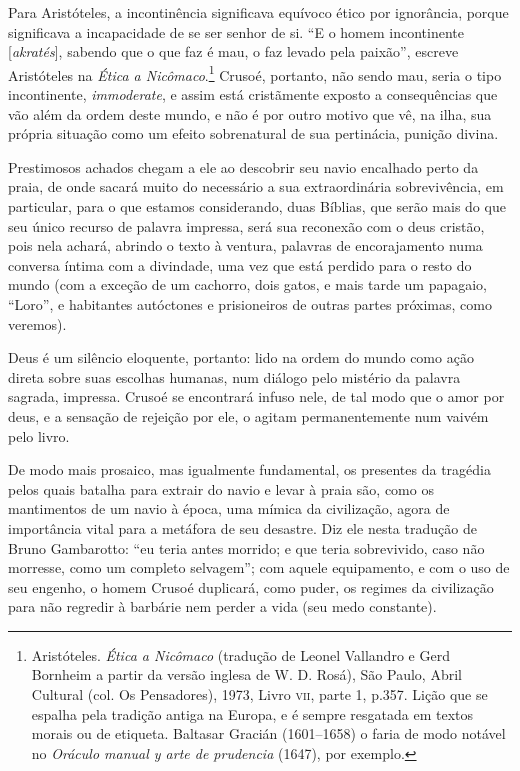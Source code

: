 Para Aristóteles, a incontinência significava equívoco ético por
ignorância, porque significava a incapacidade de se ser senhor de si.
``E o homem incontinente {[}\textit{akratés}{]}, sabendo que o que faz é mau, o
faz levado pela paixão'', escreve Aristóteles na \emph{Ética a
Nicômaco}.\footnote{Aristóteles. \emph{Ética a Nicômaco} (tradução de
  Leonel Vallandro e Gerd Bornheim a partir da versão inglesa de W. D.
  Rosá), São Paulo, Abril Cultural (col. Os Pensadores), 1973, Livro
  \textsc{vii}, parte 1, p.357. Lição que se espalha pela tradição antiga na
  Europa, e é sempre resgatada em textos morais ou de etiqueta. Baltasar
  Gracián (1601--1658) o faria de modo notável no \emph{Oráculo manual y
  arte de prudencia} (1647), por exemplo.} Crusoé, portanto, não sendo
mau, seria o tipo incontinente, \emph{immoderate}, e assim está
cristãmente exposto a consequências que vão além da ordem deste mundo, e
não é por outro motivo que vê, na ilha, sua própria situação como um
efeito sobrenatural de sua pertinácia, punição divina.

Prestimosos achados chegam a ele ao descobrir seu navio encalhado perto
da praia, de onde sacará muito do necessário a sua extraordinária
sobrevivência, em particular, para o que estamos considerando, duas
Bíblias, que serão mais do que seu único recurso de palavra impressa,
será sua reconexão com o deus cristão, pois nela achará, abrindo o texto
à ventura, palavras de encorajamento numa conversa íntima com a
divindade, uma vez que está perdido para o resto do mundo (com a exceção
de um cachorro, dois gatos, e mais tarde um papagaio, ``Loro'', e
habitantes autóctones e prisioneiros de outras partes próximas, como
veremos).

Deus é um silêncio eloquente, portanto: lido na ordem do mundo como ação
direta sobre suas escolhas humanas, num diálogo pelo mistério da palavra
sagrada, impressa. Crusoé se encontrará infuso nele, de tal modo que o
amor por deus, e a sensação de rejeição por ele, o agitam
permanentemente num vaivém pelo livro.

De modo mais prosaico, mas igualmente fundamental, os presentes da
tragédia pelos quais batalha para extrair do navio e levar à praia são,
como os mantimentos de um navio à época, uma mímica da civilização,
agora de importância vital para a metáfora de seu desastre. Diz ele
nesta tradução de Bruno Gambarotto: ``eu teria antes morrido; e que
teria sobrevivido, caso não morresse, como um completo selvagem''; com
aquele equipamento, e com o uso de seu engenho, o homem Crusoé
duplicará, como puder, os regimes da civilização para não regredir à
barbárie nem perder a vida (seu medo constante).

